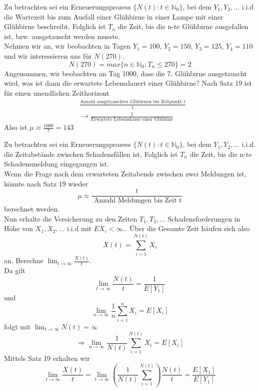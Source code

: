 \documentclass[a4paper,12pt]{article}
\begin{document}
\begin{tcolorbox}[breakable, colframe=blue, colback=white, title=Beispiel 17]
	Zu betrachten sei ein Erneuerungsprozess $\{N(t): t \in \mathbb{N}_0\}$, bei dem
	$Y_1, Y_2, ...$ i.i.d die Wartezeit bis zum Ausfall einer Glühbirne in einer Lampe
	mit einer Glühbirne beschreibt. Folglich ist $T_n$ die Zeit, bis die n-te Glühbirne
	ausgefallen ist, bzw. ausgetauscht werden musste.\\
	Nehmen wir an, wir beobachten in Tagen $Y_1 = 100$, $Y_2 = 150$, $Y_3 = 125$, $Y_4 = 110$
	und wir interessieren uns für $N(270)$.
	$$
		N(270) = max\{n \in \mathbb{N}_0: T_n \leq 270\} = 2
	$$
	Angenommen, wir beobachten an Tag 1000, dass die 7. Glühbirne ausgetauscht wird, was
	ist dann die erwartete Lebensdauert einer Glühbirne?
	Nach Satz 19 ist für einen unendlichen Zeithorizont
	\begin{align*}
		 & \frac{\text{Anzahl ausgetauschter Glübirnen bis Zeitpunkt t}}{t} \\
		 & \to \frac{1}{\text{Erwartete Lebensdauer einer Glübirne}}
	\end{align*}
	Also ist $\mu \approx \frac{1000}{7} = 143$

\end{tcolorbox}

\begin{tcolorbox}[breakable, colframe=blue, colback=white, title=Beispiel 18]
	Zu betrachten sei ein Erneuerungsprozess $\{N(t): t \in \mathbb{N}_0\}$, bei dem
	$Y_1, Y_2, ...$ i.i.d. die Zeitabstände zwischen Schadensfällen ist. Folglich ist
	$T_n$ die Zeit, bis die n-te Schadensmeldung eingegangen ist.\\
	Wenn die Frage nach dem erwarteten Zeitabends zwischen zwei Meldungen ist, könnte nach Satz 19 wieder
	$$
		\mu \approx \frac{t}{\text{ Anzahl Meldungen bis Zeit t}}
	$$
	berechnet werden.\\
	Nun erhalte die Versicherung zu den Zeiten $T_1, T_2, ...$ Schadensforderungen in Höhe von
	$X_1, X_2, ...$ i.i.d mit $E{X_i}< \infty.$. Über die Gesamte Zeit häufen sich also
	$$
		X(t) = \sum_{i=1}^{N(t)}X_i
	$$
	an. Berechne $\lim_{t \to \infty}\frac{X(t)}{t}$.\\
	Da gilt
	$$
		\lim_{t \to \infty}\frac{N(t)}{t} = \frac{1}{E[Y_1]}
	$$
	und
	$$
		\lim_{n \to \infty}\frac{1}{n}\sum_{i=1}^{n}X_i = E[X_i]
	$$
	folgt mit $\lim_{t \to \infty}N(t)= \infty$
	$$
		\Rightarrow \lim_{n \to \infty} \frac{1}{N(t)}\sum_{i=1}^{N(t)}X_i = E[X_i]
	$$
	Mittels Satz 19 erhalten wir
	$$
		\lim_{t \to \infty} \frac{X(t)}{t} =\lim_{t \to \infty} \left(\frac{1}{N(t)}\sum_{i=1}^{N(t)}\right)\frac{N(t)}{t} =
		\frac{E[X_1]}{E[Y_1]}
	$$
\end{tcolorbox}
\end{document}
